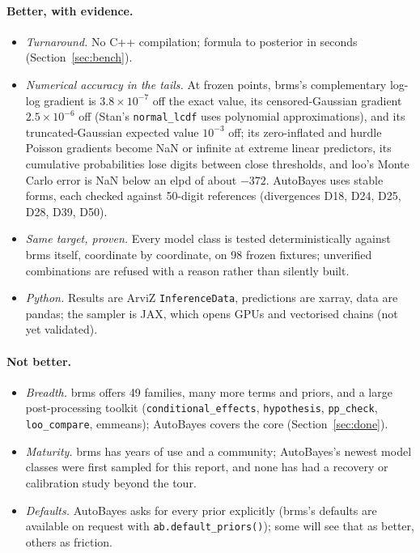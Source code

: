 \documentclass[11pt]{article}
\newcommand{\code}[1]{\texttt{#1}}
\begin{document}
\paragraph{Better, with evidence.}
\begin{itemize}
\item \emph{Turnaround.} No C++ compilation; formula to posterior in seconds (Section~\ref{sec:bench}).
\item \emph{Numerical accuracy in the tails.} At frozen points, brms's complementary log-log gradient is $3.8\times10^{-7}$ off
  the exact value, its censored-Gaussian gradient $2.5\times10^{-6}$ off (Stan's \code{normal\_lcdf} uses polynomial
  approximations), and its truncated-Gaussian expected value $10^{-3}$ off; its zero-inflated and hurdle Poisson
  gradients become NaN or infinite at extreme linear predictors, its cumulative probabilities lose digits between close
  thresholds, and loo's Monte Carlo error is NaN below an elpd of about $-372$. AutoBayes uses stable forms, each
  checked against 50-digit references (divergences D18, D24, D25, D28, D39, D50).
\item \emph{Same target, proven.} Every model class is tested deterministically against brms itself, coordinate by
  coordinate, on 98 frozen fixtures; unverified combinations are refused with a reason rather than silently built.
\item \emph{Python.} Results are ArviZ \code{InferenceData}, predictions are xarray, data are pandas; the sampler is JAX,
  which opens GPUs and vectorised chains (not yet validated).
\end{itemize}

\paragraph{Not better.}
\begin{itemize}
\item \emph{Breadth.} brms offers 49 families, many more terms and priors, and a large post-processing toolkit
  (\code{conditional\_effects}, \code{hypothesis}, \code{pp\_check}, \code{loo\_compare}, emmeans); AutoBayes covers the
  core (Section~\ref{sec:done}).
\item \emph{Maturity.} brms has years of use and a community; AutoBayes's newest model classes were first sampled for
  this report, and none has had a recovery or calibration study beyond the tour.
\item \emph{Defaults.} AutoBayes asks for every prior explicitly (brms's defaults are available on request with
  \code{ab.default\_priors()}); some will see that as better, others as friction.
\end{itemize}
\end{document}
